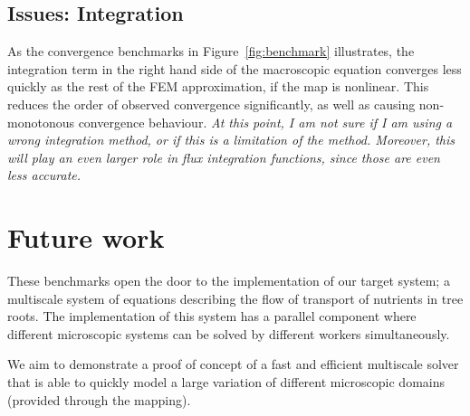 \documentclass{article}
\begin{document}
\subsection{Issues: Integration}
\label{sec:integration}
As the convergence benchmarks in Figure~\ref{fig:benchmark} illustrates, the integration term in the right hand side of the macroscopic equation converges less quickly as the rest of the FEM approximation, if the map is nonlinear.
This reduces the order of observed convergence significantly, as well as causing non-monotonous convergence behaviour.
\emph{At this point, I am not sure if I am using a wrong integration method, or if this is a limitation of the method. Moreover, this will play an even larger role in flux integration functions, since those are even less accurate.}

\section{Future work}
\label{sec:next}
These benchmarks open the door to the implementation of our target system; a multiscale system of equations describing the flow of transport of nutrients in tree roots. The implementation of this system has a parallel component where different microscopic systems can be solved by different workers simultaneously.

We aim to demonstrate a proof of concept of a fast and efficient multiscale solver that is able to quickly model a large variation of different microscopic domains (provided through the mapping).
\end{document}

